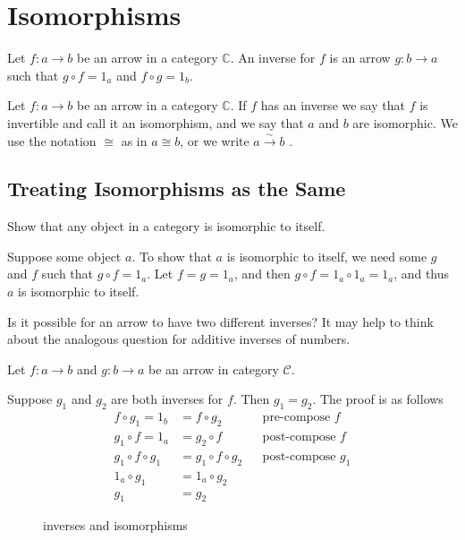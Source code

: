 \section{Isomorphisms}
\begin{definition}
	Let $f:a\rightarrow b$ be an arrow in a category $\mathbb{C}$. An inverse for
	$f$ is an arrow $g:b\rightarrow a$ such that $g \circ f = 1_a$ and $f \circ g =
		1_b$.
\end{definition}

\begin{definition}
	Let $f:a\rightarrow b$ be an arrow in a category $\mathbb{C}$. If $f$ has an
	inverse we say that $f$ is invertible and call it an isomorphism, and we say
	that $a$ and $b$ are isomorphic. We use the notation $\cong$ as in $a \cong b$,
	or we write $a \xrightarrow{\sim} b$ .
\end{definition}

\subsection{Treating Isomorphisms as the Same}
\setcounter{tttacounter}{3}
\begin{ttta}
	Show that any object in a category is isomorphic to itself.
	\begin{proofitem}
		\item Suppose some object $a$. To show that $a$ is isomorphic to itself, we
		need some $g$ and $f$ such that $g\circ f=1_a$. Let $f=g=1_a$, and then
		$g\circ f=1_a \circ 1_a = 1_a$, and thus $a$ is isomorphic to itself.
	\end{proofitem}
\end{ttta}

\begin{ttta}
	Is it possible for an arrow to have two different inverses? It may help to think
	about the analogous question for additive inverses of numbers.
	\begin{proofitem}
		\item Let $f:a\rightarrow b$ and $g:b\rightarrow a$ be an arrow in category $\mathcal{C}$.
		\item Suppose $g_1$ and $g_2$ are both inverses for $f$. Then $g_1=g_2$. The
		proof is as follows
		\begin{align*}
			f\circ g_1 = 1_b     & = f\circ g_2           &  & \text{pre-compose }f    \\
			g_1\circ f = 1_a     & = g_2\circ f           &  & \text{post-compose }f   \\
			g_1 \circ f\circ g_1 & = g_1 \circ f\circ g_2 &  & \text{post-compose }g_1 \\
			1_a\circ g_1         & = 1_a \circ g_2                                     \\
			g_1                  & = g_2
		\end{align*}
	\end{proofitem}
	\begin{figure}[H]
		\begin{center}
			
		\end{center}
		\caption{inverses and isomorphisms}
	\end{figure}
\end{ttta}

